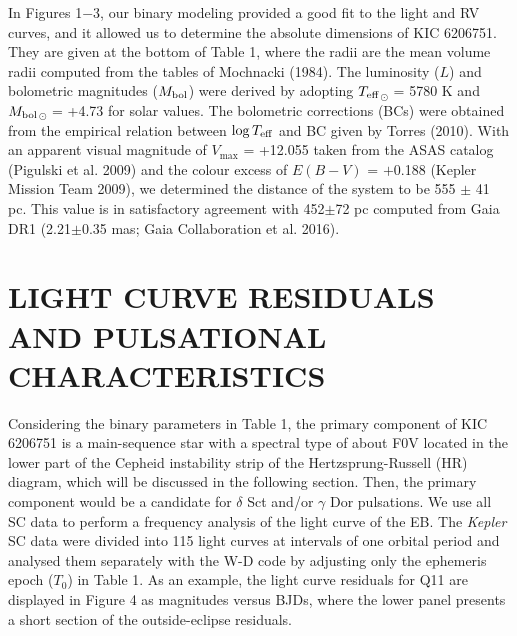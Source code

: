 \documentclass[useAMS,usenatbib,usegraphicx]{mn2e}
\begin{document}
In Figures 1$-$3, our binary modeling provided a good fit to the light and RV curves, and it allowed us to determine 
the absolute dimensions of KIC 6206751. They are given at the bottom of Table 1, where the radii are the mean volume radii 
computed from the tables of Mochnacki (1984). The luminosity ($L$) and bolometric magnitudes ($M_{\rm bol}$) were derived 
by adopting $T_{\rm eff}$$_\odot$ = 5780 K and $M_{\rm bol}$$_\odot$ = +4.73 for solar values. The bolometric corrections 
(BCs) were obtained from the empirical relation between $\log T_{\rm eff}$ and BC given by Torres (2010). With an apparent 
visual magnitude of $V_{\max}$ = +12.055 taken from the ASAS catalog (Pigulski et al. 2009) and the colour excess of 
$E(B-V)$ = $+$0.188 (Kepler Mission Team 2009), we determined the distance of the system to be 555 $\pm$ 41 pc. This value 
is in satisfactory agreement with 452$\pm$72 pc computed from Gaia DR1 (2.21$\pm$0.35 mas; Gaia Collaboration et al. 2016).


\section{LIGHT CURVE RESIDUALS AND PULSATIONAL CHARACTERISTICS}

Considering the binary parameters in Table 1, the primary component of KIC 6206751 is a main-sequence star with a spectral 
type of about F0V located in the lower part of the Cepheid instability strip of the Hertzsprung-Russell (HR) diagram, 
which will be discussed in the following section. Then, the primary component would be a candidate for $\delta$ Sct and/or 
$\gamma$ Dor pulsations. We use all SC data to perform a frequency analysis of the light curve of the EB. The {\it Kepler} 
SC data were divided into 115 light curves at intervals of one orbital period and analysed them separately with the W-D code 
by adjusting only the ephemeris epoch ($T_0$) in Table 1. As an example, the light curve residuals for Q11 are displayed in 
Figure 4 as magnitudes versus BJDs, where the lower panel presents a short section of the outside-eclipse residuals. 
\end{document}
